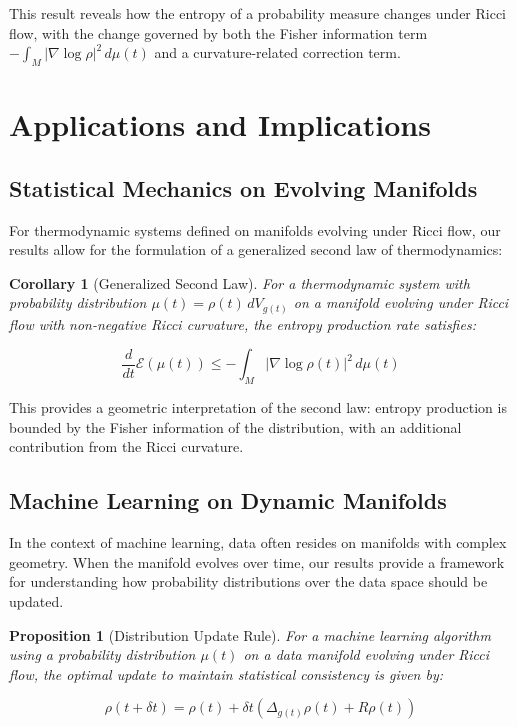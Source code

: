 \documentclass[12pt,a4paper]{article}
\newtheorem{proposition}[theorem]{Proposition}
\newtheorem{corollary}[theorem]{Corollary}
\begin{document}
This result reveals how the entropy of a probability measure changes under Ricci flow, with the change governed by both the Fisher information term $-\int_M |\nabla \log \rho|^2 \, d\mu(t)$ and a curvature-related correction term.

\section{Applications and Implications}

\subsection{Statistical Mechanics on Evolving Manifolds}

For thermodynamic systems defined on manifolds evolving under Ricci flow, our results allow for the formulation of a generalized second law of thermodynamics:

\begin{corollary}[Generalized Second Law]
For a thermodynamic system with probability distribution $\mu(t) = \rho(t) \, dV_{g(t)}$ on a manifold evolving under Ricci flow with non-negative Ricci curvature, the entropy production rate satisfies:

\begin{equation}
\frac{d}{dt}\mathcal{E}(\mu(t)) \leq -\int_M |\nabla \log \rho(t)|^2 \, d\mu(t)
\end{equation}
\end{corollary}

This provides a geometric interpretation of the second law: entropy production is bounded by the Fisher information of the distribution, with an additional contribution from the Ricci curvature.

\subsection{Machine Learning on Dynamic Manifolds}

In the context of machine learning, data often resides on manifolds with complex geometry. When the manifold evolves over time, our results provide a framework for understanding how probability distributions over the data space should be updated.

\begin{proposition}[Distribution Update Rule]
For a machine learning algorithm using a probability distribution $\mu(t)$ on a data manifold evolving under Ricci flow, the optimal update to maintain statistical consistency is given by:

\begin{equation}
\rho(t + \delta t) = \rho(t) + \delta t (\Delta_{g(t)} \rho(t) + R \rho(t))
\end{equation}
\end{proposition}
\end{document}
